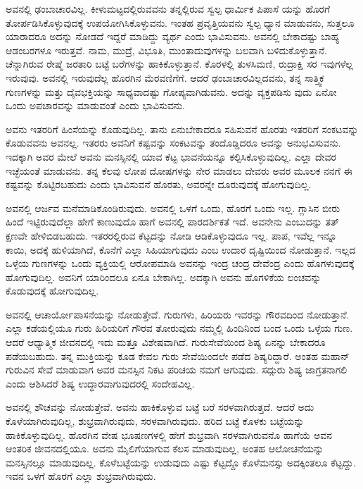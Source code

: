 ಅವನಲ್ಲಿ ಢಂಬಾಚಾರವಿಲ್ಲ. ಕೀಳುಮಟ್ಟದಲ್ಲಿರುವವನು ತನ್ನಲ್ಲಿರುವ ಸ್ವಲ್ಪ ಧಾರ್ಮಿಕ ಪಿಪಾಸೆ ಯನ್ನು ಹೊರಗೆ ತೋರ್ಪಡಿಸಿಕೊಳ್ಳುವುದಕ್ಕೆ ಉಪಯೋಗಿಸಿಕೊಳ್ಳುವನು. ಇಂತಹ ಪ್ರವೃತ್ತಿಯವನು ಸ್ವಲ್ಪ ಧ್ಯಾನ ಮಾಡುವನು, ಸುತ್ತಲೂ ಯಾರಾದರೂ ಅದನ್ನು ನೋಡದೆ ಇದ್ದರೆ ಮಾಡಿದ್ದು ವ್ಯರ್ಥ ಎಂದು ಭಾವಿಸುವನು. ಅವನಲ್ಲಿ ಬೇಕಾದಷ್ಟು ಬಾಹ್ಯ ಆಡಂಬರಗಳೂ ಇರುತ್ತವೆ. ನಾಮ, ಮುದ್ರೆ, ವಿಭೂತಿ, ಮುಂತಾದುವುಗಳನ್ನು ಬಲವಾಗಿ ಬಳಿದುಕೊಳ್ಳುತ್ತಾನೆ. ಚೆನ್ನಾಗಿರುವ ರೇಷ್ಮೆ ಜರತಾರಿ ಬಟ್ಟೆ ಬರೆಗಳನ್ನು ಹಾಕಿಕೊಳ್ಳುತ್ತಾನೆ. ಕೊರಳಲ್ಲಿ ತುಳಸಿಮಣಿ, ರುದ್ರಾಕ್ಷಿ ಸರ ಇವುಗಳೆಲ್ಲ ಇರುವುವು. ಅವನಲ್ಲಿ ಇರುವುದೆಲ್ಲ ಹೊರಗಿನ ಮೆರವಣಿಗೆಗೆ. ಆದರೆ ಢಂಬಾಚಾರವಿಲ್ಲದವನು, ತನ್ನ ಸಾತ್ತ್ವಿಕ ಗುಣಗಳನ್ನು ಮತ್ತು ದೈವಭಕ್ತಿಯನ್ನು ಸಾಧ್ಯವಾದಷ್ಟು ಗೋಪ್ಯವಾಗಿಡುವನು. ಅದನ್ನು ವ್ಯಕ್ತಪಡಿಸು ವುದು ಏನೋ ಒಂದು ಅಪಚಾರವನ್ನು ಮಾಡುವಂತೆ ಎಂದು ಭಾವಿಸುವನು.

ಅವನು ಇತರರಿಗೆ ಹಿಂಸೆಯನ್ನು ಕೊಡುವುದಿಲ್ಲ. ತಾನು ಏನುಬೇಕಾದರೂ ಸಹಿಸುವನೆ ಹೊರತು ಇತರರಿಗೆ ಸಂಕಟವನ್ನು ಕೊಡುವವನು ಅವನಲ್ಲ. ಇತರರು ಅವನಿಗೆ ಕಷ್ಟವನ್ನು ಸಂಕಟವನ್ನು ತಂದೊಡ್ಡಿದರೂ ಅವನ್ನು ಅನುಭವಿಸುವನು. ಇದಕ್ಕಾಗಿ ಅವರ ಮೇಲೆ ಅವನು ಮನಸ್ಸಿನಲ್ಲಿ ಯಾವ ಕೆಟ್ಟ ಭಾವನೆಯನ್ನೂ ಕಲ್ಪಿಸಿಕೊಳ್ಳುವುದಿಲ್ಲ. ಎಲ್ಲಾ ದೇವರ ಇಚ್ಛೆಯಂತೆ ಮಾಡುವನು. ತನ್ನ ಕೆಲವು ಲೋಪ ದೋಷಗಳನ್ನು ನೇರ ಮಾಡಲು ದೇವರು ಅವರ ಮೂಲಕ ನನಗೆ ಈ ಕಷ್ಟವನ್ನು ಕೊಟ್ಟಿರಬಹುದು ಎಂದು ಭಾವಿಸುವನೆ ಹೊರತು, ಅವರನ್ನೇ ದೂರುವುದಕ್ಕೆ ಹೋಗುವುದಿಲ್ಲ. 

ಅವನಲ್ಲಿ ಆರ್ಜವ ಮನೆಮಾಡಿಕೊಂಡಿರುವುದು. ಅವನಲ್ಲಿ ಒಳಗೆ ಒಂದು, ಹೊರಗೆ ಒಂದು ಇಲ್ಲ. ಗ್ಲಾಸಿನ ಬೀರು ಹಿಂದೆ ಇಟ್ಟಿರುವುದೆಲ್ಲಾ ಹೇಗೆ ಕಾಣುವುದೊ ಹಾಗೆ ಅವನಲ್ಲಿ ಪಾರದರ್ಶಿಕತೆ ಇದೆ. ಅವನೇನು ಎಂಬುದನ್ನು ತತ್​ಕ್ಷಣವೇ ಹೇಳಿಬಿಡಬಹುದು. ಇತರರಲ್ಲಿರುವ ಕೆಟ್ಟದನ್ನು ನೋಡಿ ಆಡಿಕೊಳ್ಳುವುದೂ ಇಲ್ಲ. ಪಾಪ, ಇವೆಲ್ಲ ಇನ್ನೂ ಕಾಯಿ, ಅದಕ್ಕೆ ಹುಳಿಯಾಗಿದೆ, ಕೊನೆಗೆ ಎಲ್ಲಾ ಸಿಹಿಯಾಗುವುದು ಎಂಬ ಉದಾರ ದೃಷ್ಟಿಯಿಂದ ನೋಡುತ್ತಾನೆ. ಇಲ್ಲದ ಒಳ್ಳೆಯ ಗುಣಗಳನ್ನು ಒಂದು ವ್ಯಕ್ತಿಯಲ್ಲಿ ಆರೋಪಮಾಡಿ ಅವನನ್ನು ಇಂದ್ರ ಚಂದ್ರ ದೇವೆಂದ್ರ ಎಂದು ಹೊಗಳುವುದಕ್ಕೆ ಹೋಗುವುದಿಲ್ಲ. ಅವನಿಗೆ ಯಾರಿಂದಲೂ ಏನೂ ಬೇಕಾಗಿಲ್ಲ. ಅದಕ್ಕಾಗಿ ಅವನು ಹೊಗಳಿಕೆಯ ಲಂಚವನ್ನು ಕೊಡುವುದಕ್ಕೆ ಹೋಗುವುದಿಲ್ಲ.

ಅವನಲ್ಲಿ ಆಚಾರ್ಯೋಪಾಸನೆಯನ್ನು ನೋಡುತ್ತೇವೆ. ಗುರುಗಳು, ಹಿರಿಯರು ಇವರನ್ನು ಗೌರವದಿಂದ ನೋಡುತ್ತಾನೆ. ಎಲ್ಲಾ ಕಡೆಯಲ್ಲಿಯೂ ಗುರು ಹಿರಿಯರಿಗೆ ಗೌರವ ತೋರುವುದು ನಮ್ಮಲ್ಲಿ ಹಿಂದಿನಿಂದ ಬಂದ ಒಂದು ಒಳ್ಳೆಯ ಗುಣ. ಆದರೆ ಆಧ್ಯಾತ್ಮಿಕ ಜೀವನದಲ್ಲಿ ಇದು ಮತ್ತೂ ವಿಶೇಷವಾಗಿದೆ. ಗುರುಸೇವೆಯಿಂದ ಶಿಷ್ಯ ಏನನ್ನು ಬೇಕಾದರೂ ಪಡೆಯಬಹುದು. ತನ್ನ ಮುಕ್ತಿಯನ್ನು ಕೂಡ ಕೇವಲ ಗುರು ಸೇವೆಯಿಂದಲೇ ಪಡೆದ ಶಿಷ್ಯರಿದ್ದಾರೆ. ಅಂತಹ ಮಹಾನ್ ಗುರುವಿನ ಸೇವೆ ಮಾಡುವಾಗ ಅವರ ಮನಸ್ಸಿನ ನಿಕಟ ಪರಿಚಯ ನಮಗೆ ಆಗುವುದು. ಸದ್ಗುರು ಶಿಷ್ಯ ಜಾಗ್ರತನಾಗಲಿ ಎಂದು ಆಶಿಸಿದರೆ ಶಿಷ್ಯ ಉದ್ಧಾರವಾಗುವುದರಲ್ಲಿ ಸಂದೇಹವಿಲ್ಲ.

ಅವನಲ್ಲಿ ಶೌಚವನ್ನು ನೋಡುತ್ತೇವೆ. ಅವನು ಹಾಕಿಕೊಳ್ಳುವ ಬಟ್ಟೆ ಬರೆ ಸರಳವಾಗಿರುತ್ತದೆ. ಆದರೆ ಅದು ಕೊಳೆಯಾಗಿರುವುದಿಲ್ಲ, ಶುಭ್ರವಾಗಿರುವುದು, ಸರಳವಾಗಿರುವುದು. ಹರಿದ ಬಟ್ಟೆ ಕೊಳಕು ಬಟ್ಟೆಯನ್ನು ಹಾಕಿಕೊಳ್ಳುವುದಿಲ್ಲ. ಹೊರಗಿನ ವೇಷ ಭೂಷಣಗಳಲ್ಲಿ ಹೇಗೆ ಶುಭ್ರವಾಗಿ ಸರಳವಾಗಿರುವನೊ ಹಾಗೆಯೆ ಅವನ ಆಂತರಿಕ ಜೀವನದಲ್ಲಿಯೂ. ಅವನು ಮೈಲಿಗೆಯಾಗುವ ಕೆಲಸ ಮಾಡುವುದಿಲ್ಲ, ಅಂತಹ ಆಲೋಚನೆಯನ್ನು ಮನಸ್ಸಿನಲ್ಲೂ ಮಾಡುವುದಿಲ್ಲ. ಕೊಳೆಬಟ್ಟೆಯನ್ನು ಉಡುವುದು ಎಷ್ಟು ಕೆಟ್ಟದ್ದೊ ಕೊಳೆಮನಸ್ಸು ಅದಕ್ಕಿಂತಲೂ ಕೆಟ್ಟದ್ದು. ಇವನ ಒಳಗೆ ಹೊರಗೆ ಎಲ್ಲಾ ಶುಭ್ರವಾಗಿರುವುದು.

